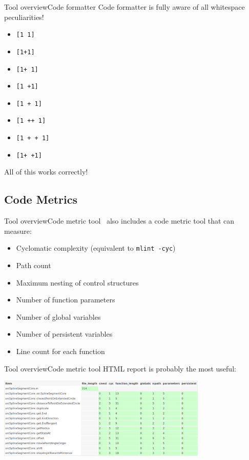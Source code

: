 \documentclass{beamer}
\newcommand{\mh}[0]{{\sc\structure{Miss\_Hit}}}
\begin{document}
\begin{frame}[fragile]{Tool overview}{Code formatter}
  Code formatter is fully aware of all whitespace peculiarities!
  \pause
  \begin{itemize}
  \item \verb|[1 1]|
  \item \verb|[1+1]|
  \item \verb|[1+ 1]|
  \item \verb|[1 +1]|
  \item \verb|[1 + 1]|
  \item \verb|[1 ++ 1]|
  \item \verb|[1 + + 1]|
  \item \verb|[1+ +1]|
  \end{itemize}
  All of this works correctly!
\end{frame}

\subsection{Code Metrics}
\begin{frame}{Tool overview}{Code metric tool}
  \mh~also includes a code metric tool that can measure:
  \begin{itemize}
  \item Cyclomatic complexity (equivalent to {\tt mlint -cyc})
  \item Path count
  \item Maximum nesting of control structures
  \item Number of function parameters
  \item Number of global variables
  \item Number of persistent variables
  \item Line count for each function
  \end{itemize}
\end{frame}

\begin{frame}{Tool overview}{Code metric tool}
  HTML report is probably the most useful:
  \begin{center}
    \includegraphics[width=10cm]{metrics.png}
  \end{center}
\end{frame}
\end{document}
